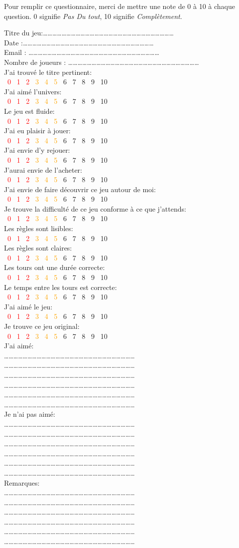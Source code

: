 \documentclass[11pt,a4paper]{letter}
\newcommand\checkbox[1]{%
    \Square\ #1\quad%
}
\newcommand{\note}[1]{
#1\\
\textcolor{red}{\checkbox{0}} \textcolor{red}{\checkbox{1}} \textcolor{red}{\checkbox{2}}  \textcolor{orange}	{\checkbox{3}}  \textcolor{orange}{\checkbox{4}}  \textcolor{orange}{\checkbox{5}} 	\checkbox{6} \checkbox{7} \textcolor{vert}{\checkbox{8}} \textcolor{vert}{\checkbox{9}} 	\textcolor{vert}{\checkbox{10}}\\
}
\newcommand{\points}{…………………………………………………………………………\\}
\newcommand{\pointsmultilines}{\\\points\points\points\points\points\points}
\begin{document}
Pour remplir ce questionnaire, merci de mettre une note de 0 à 10 à chaque question. 0 signifie \textit{Pas Du tout}, 10 signifie \textit{Complètement}.

Titre du jeu:\points
Date :\points
Email : \points
Nombre de joueurs : \points

\note{J'ai trouvé le titre pertinent:}
\note{J'ai aimé l'univers:}
\note{Le jeu est fluide:}
\note{J'ai eu plaisir à jouer:}
\note{J'ai envie d'y rejouer:}
\note{J'aurai envie de l'acheter:}
\note{J'ai envie de faire découvrir ce jeu autour de moi:}
\note{Je trouve la difficulté de ce jeu conforme à ce que j'attends:}
\note{Les règles sont lisibles:}
\note{Les règles sont claires:}
\note{Les tours ont une durée correcte:}
\note{Le temps entre les tours est correcte:}
\note{J'ai aimé le jeu:}
\note{Je trouve ce jeu original:}
J'ai aimé: \pointsmultilines
Je n'ai pas aimé:\pointsmultilines
Remarques:\pointsmultilines
\end{document}
